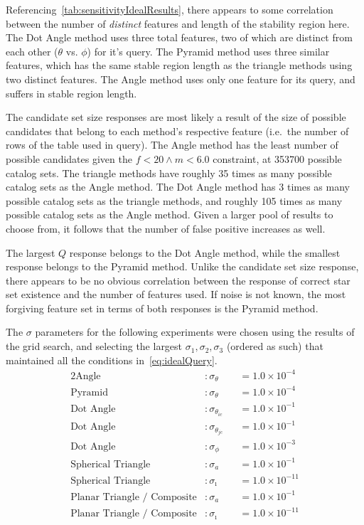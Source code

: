Referencing~\autoref{tab:sensitivityIdealResults}, there appears to some correlation between the number of
\textit{distinct} features and length of the stability region here.
The Dot Angle method uses three total features, two of which are distinct from each other ($\theta$ vs. $\phi$) for
it's query.
The Pyramid method uses three similar features, which has the same stable region length as the triangle methods
using two distinct features.
The Angle method uses only one feature for its query, and suffers in stable region length.

The candidate set size responses are most likely a result of the size of possible candidates that belong to each
method's respective feature (i.e.\ the number of rows of the table used in query).
The Angle method has the least number of possible candidates given the $f < 20 \land m < 6.0$ constraint, at 353700
possible catalog sets.
The triangle methods have roughly 35 times as many possible catalog sets as the Angle method.
The Dot Angle method has 3 times as many possible catalog sets as the triangle methods, and roughly 105 times as many
possible catalog sets as the Angle method.
Given a larger pool of results to choose from, it follows that the number of false positive increases as well.

The largest $Q$ response belongs to the Dot Angle method, while the smallest response belongs to the Pyramid method.
Unlike the candidate set size response, there appears to be no obvious correlation between the response of correct
star set existence and the number of features used.
If noise is not known, the most forgiving feature set in terms of both responses is the Pyramid method.

The $\sigma$ parameters for the following experiments were chosen using the results of the grid search, and selecting
the largest $\sigma_1, \sigma_2, \sigma_3$ (ordered as such) that maintained all the
conditions in~\autoref{eq:idealQuery}.
\begin{alignat*}{2}
    \text{Angle}&: \sigma_\theta &&= 1.0 \times 10^{-4}\\
    \text{Pyramid}&: \sigma_\theta &&= 1.0 \times 10^{-4}\\
    \text{Dot Angle}&: \sigma_{\theta_{ic}} &&= 1.0 \times 10^{-1}\\
    \text{Dot Angle}&: \sigma_{\theta_{jc}} &&= 1.0 \times 10^{-1}\\
    \text{Dot Angle}&: \sigma_\phi &&= 1.0 \times 10^{-3} \\
    \text{Spherical Triangle}&: \sigma_a &&= 1.0 \times 10^{-1}\\
    \text{Spherical Triangle}&: \sigma_\imath &&= 1.0 \times 10^{-11}\\
    \text{Planar Triangle / Composite}&: \sigma_a &&= 1.0 \times 10^{-1} \\
    \text{Planar Triangle / Composite}&: \sigma_\imath &&= 1.0 \times 10^{-11}\\
\end{alignat*}

